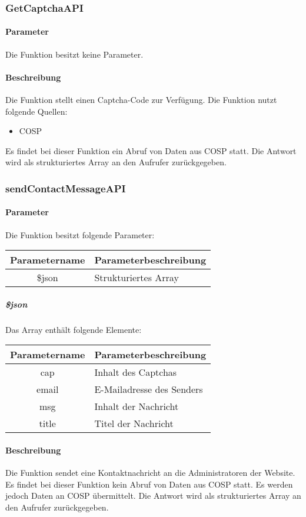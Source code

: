 \subsubsection{GetCaptchaAPI}
\paragraph{Parameter} Die Funktion besitzt keine Parameter.
\paragraph{Beschreibung} Die Funktion stellt einen Captcha-Code zur Verfügung. Die Funktion nutzt folgende Quellen:
\begin{itemize}
	\item COSP
\end{itemize}
Es findet bei dieser Funktion ein Abruf von Daten aus {\glqq COSP\grqq} statt. Die Antwort wird als strukturiertes Array an den Aufrufer zurückgegeben.
\subsubsection{sendContactMessageAPI}
\paragraph{Parameter} Die Funktion besitzt folgende Parameter:
\begin{table}[H]
	\begin{tabular}{|c|p{11cm}|}
		\hline
		\textbf{Parametername} & \textbf{Parameterbeschreibung} \\ \hline
		\$json & Strukturiertes Array \\ \hline
	\end{tabular}
\end{table}
\subparagraph{\$json}Das Array enthält folgende Elemente:
\begin{table}[H]
	\begin{tabular}{|c|p{11cm}|}
		\hline
		\textbf{Parametername} & \textbf{Parameterbeschreibung} \\ \hline
		cap   & Inhalt des Captchas \\ \hline
		email & E-Mailadresse des Senders \\ \hline
		msg   & Inhalt der Nachricht \\ \hline
		title & Titel der Nachricht \\ \hline
	\end{tabular}
\end{table}
\paragraph{Beschreibung} Die Funktion sendet eine Kontaktnachricht an die Administratoren der Website. Es findet bei dieser Funktion kein Abruf von Daten aus {\glqq COSP\grqq} statt. Es werden jedoch Daten an {\glqq COSP\grqq} übermittelt. Die Antwort wird als strukturiertes Array an den Aufrufer zurückgegeben.
